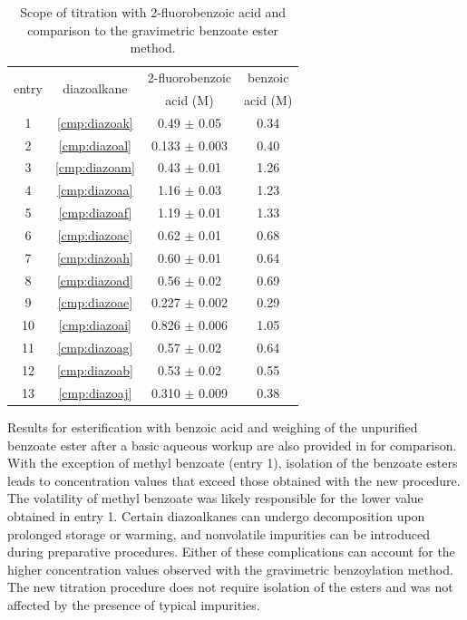 \begin{table}[ht]
{\begin{tabular}{cccc}
\toprule
\multirow{2}{*}{entry} & \multirow{2}{*}{diazoalkane} & 2-fluorobenzoic & benzoic  \\
&&acid (M) & acid (M) \\
\midrule
1 & \ref{cmp:diazoak} & 0.49 $\pm$ 0.05& 0.34 \\
2 & \ref{cmp:diazoal} & 0.133 $\pm$ 0.003& 0.40 \\
3 & \ref{cmp:diazoam} & 0.43 $\pm$ 0.01& 1.26 \\
4 & \ref{cmp:diazoaa} & 1.16 $\pm$ 0.03& 1.23 \\
5 & \ref{cmp:diazoaf} & 1.19 $\pm$ 0.01& 1.33 \\
6 & \ref{cmp:diazoac} & 0.62 $\pm$ 0.01& 0.68 \\
7 & \ref{cmp:diazoah} & 0.60 $\pm$ 0.01& 0.64 \\
8 & \ref{cmp:diazoad} & 0.56 $\pm$ 0.02& 0.69 \\
9 & \ref{cmp:diazoae} & 0.227 $\pm$ 0.002& 0.29 \\
10 & \ref{cmp:diazoai} & 0.826 $\pm$ 0.006& 1.05 \\
11 & \ref{cmp:diazoag} & 0.57 $\pm$ 0.02& 0.64 \\
12 & \ref{cmp:diazoab} & 0.53 $\pm$ 0.02& 0.55 \\
13 & \ref{cmp:diazoaj} & 0.310 $\pm$ 0.009& 0.38 \\
\bottomrule
\end{tabular}
}
\caption{Scope of titration with 2-fluorobenzoic acid and comparison to the gravimetric benzoate
ester method.}
\label{tbl:astitration}
\end{table}

Results for esterification with benzoic acid and weighing of the unpurified benzoate ester after a
basic aqueous workup are also provided in  for comparison. With the exception of
methyl benzoate (entry 1), isolation of the benzoate esters leads to concentration values that
exceed those obtained with the new procedure. The volatility of methyl benzoate was likely responsible for
the lower value obtained in entry 1. Certain diazoalkanes can undergo decomposition upon prolonged
storage or warming, and nonvolatile impurities can be introduced during preparative
procedures. Either of these complications can account for the higher
concentration values observed with the gravimetric benzoylation method. The new titration procedure
does not require isolation of the esters and was not affected by the presence of typical impurities.

